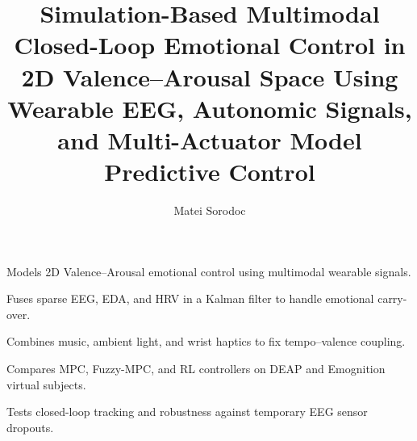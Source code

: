 \documentclass[preprint,12pt]{elsarticle}
\begin{document}
\begin{frontmatter}

\title{Simulation-Based Multimodal Closed-Loop Emotional Control in 2D Valence--Arousal Space Using Wearable EEG, Autonomic Signals, and Multi-Actuator Model Predictive Control}

\author[utcn]{Matei Sorodoc}


\begin{highlights}
\item Models 2D Valence--Arousal emotional control using multimodal wearable signals.
\item Fuses sparse EEG, EDA, and HRV in a Kalman filter to handle emotional carry-over.
\item Combines music, ambient light, and wrist haptics to fix tempo--valence coupling.
\item Compares MPC, Fuzzy-MPC, and RL controllers on DEAP and Emognition virtual subjects.
\item Tests closed-loop tracking and robustness against temporary EEG sensor dropouts.
\end{highlights}


\end{frontmatter}
\end{document}
